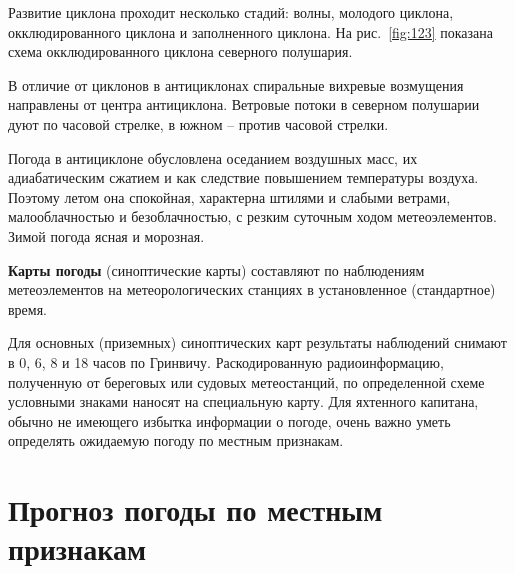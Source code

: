 \documentclass[a4paper, 12pt, twoside, final, book, russian, fittopage, cyremdash]{ncc}
\newcommand{\ris}[1]{\ref{fig:#1}}
\begin{document}
Развитие циклона проходит несколько стадий: волны, молодого циклона, окклюдированного циклона и заполненного циклона. На рис.~\ris{123} показана схема окклюдированного циклона северного полушария.

В отличие от циклонов в антициклонах спиральные вихревые возмущения направлены от центра антициклона. Ветровые потоки в северном полушарии дуют по часовой стрелке, в южном \--- против часовой стрелки.

Погода в антициклоне обусловлена оседанием воздушных масс, их адиабатическим сжатием и как следствие повышением температуры воздуха. Поэтому летом она спокойная, характерна штилями и слабыми ветрами, малооблачностью и безоблачностью, с резким суточным ходом метеоэлементов. Зимой погода ясная и морозная.

\textbf{Карты погоды} (синоптические карты) составляют по наблюдениям метеоэлементов на метеорологических станциях в установленное (стандартное) время.

Для основных (приземных) синоптических карт результаты наблюдений снимают в 0, 6, 8 и 18 часов по Гринвичу. Раскодированную радиоинформацию, полученную от береговых или судовых метеостанций, по определенной схеме условными знаками наносят на специальную карту. Для яхтенного капитана, обычно не имеющего избытка информации о погоде, очень важно уметь определять ожидаемую погоду по местным признакам.

\section{Прогноз погоды по местным признакам}
\end{document}
